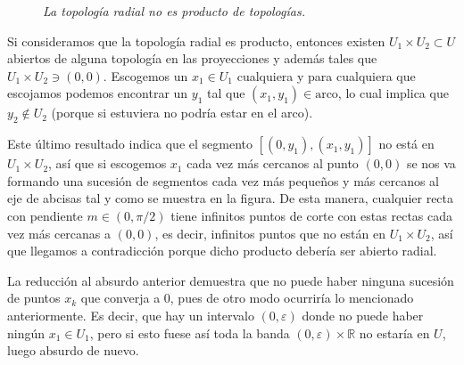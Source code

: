 \begin{ej}
\begin{figure}[H]
    \centering
    \caption{\textit{La topología radial no es producto de topologías.}}
\end{figure}

Si consideramos que la topología radial es producto, entonces existen $U_1 \times U_2 \subset U$ abiertos de alguna topología en las proyecciones y además tales que $U_1\times U_2 \ni (0,0)$. Escogemos un $x_1 \in U_1$ cualquiera y para cualquiera que escojamos podemos encontrar un $y_1$ tal que $(x_1,y_1)\in \mbox{arco}$, lo cual implica que $y_2 \not\in U_2$ (porque si estuviera no podría estar en el arco).

Este último resultado indica que el segmento $[(0, y_1), (x_1, y_1)]$ no está en $U_1\times U_2$, así que si escogemos $x_1$ cada vez más cercanos al punto $(0,0)$ se nos va formando una sucesión de segmentos cada vez más pequeños y más cercanos al eje de abcisas tal y como se muestra en la figura. De esta manera, cualquier recta con pendiente $m\in (0,\pi/2)$ tiene infinitos puntos de corte con estas rectas cada vez más cercanas a $(0,0)$, es decir, infinitos puntos que no están en $U_1\times U_2$, así que llegamos a contradicción porque dicho producto debería ser abierto radial.

La reducción al absurdo anterior demuestra que no puede haber ninguna sucesión de puntos $x_k$ que converja a $0$, pues de otro modo ocurriría lo mencionado anteriormente. Es decir, que hay un intervalo $(0,\varepsilon)$ donde no puede haber ningún $x_1\in U_1$, pero si esto fuese así toda la banda $(0,\varepsilon)\times \mathbb{R}$ no estaría en $U$, luego absurdo de nuevo.
\end{ej}


